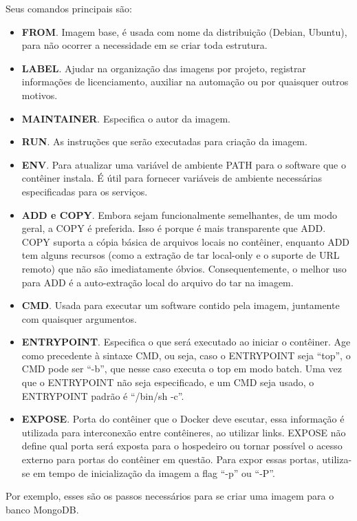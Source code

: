 \documentclass[a4paper,11pt]{article}
\begin{document}
Seus comandos principais são: \vspace{-1em}
\begin{itemize}
	\item \textbf{FROM}. Imagem base, é usada com nome da distribuição (Debian, Ubuntu), para não ocorrer a necessidade em se criar toda estrutura.
	\item \textbf{LABEL}. Ajudar na organização das imagens por projeto, registrar informações de licenciamento, auxiliar na automação ou por quaisquer outros motivos.
	\item \textbf{MAINTAINER}. Especifica o autor da imagem.
	\item \textbf{RUN}. As instruções que serão executadas para criação da imagem.
	\item \textbf{ENV}. Para atualizar uma variável de ambiente PATH para o software que o contêiner instala. É útil para fornecer variáveis de ambiente necessárias especificadas para os serviços.
	\item \textbf{ADD e COPY}. Embora sejam funcionalmente semelhantes, de um modo geral, a COPY é preferida. Isso é porque é mais transparente que ADD. COPY suporta a cópia básica de arquivos locais no contêiner, enquanto ADD tem alguns recursos (como a extração de tar local-only e o suporte de URL remoto) que não são imediatamente óbvios. Consequentemente, o melhor uso para ADD é a auto-extração local do arquivo do tar na imagem.
	\item \textbf{CMD}. Usada para executar um software contido pela imagem, juntamente com quaisquer argumentos.
	\item \textbf{ENTRYPOINT}. Especifica o que será executado ao iniciar o contêiner. Age como precedente à sintaxe CMD, ou seja, caso o ENTRYPOINT seja ``top'', o CMD pode ser ``-b'', que nesse caso executa o top em modo batch. Uma vez que o ENTRYPOINT não seja especificado, e um CMD seja usado, o ENTRYPOINT padrão é ``/bin/sh -c''. 
	\item \textbf{EXPOSE}. Porta do contêiner que o Docker deve escutar, essa informação é utilizada para interconexão entre contêineres, ao utilizar links. EXPOSE não define qual porta será exposta para o hospedeiro ou tornar possível o acesso externo para portas do contêiner em questão. Para expor essas portas, utiliza-se em tempo de inicialização da imagem a flag ``-p'' ou ``-P''.
\end{itemize}

Por exemplo, esses são os passos necessários para se criar uma imagem para o banco MongoDB.
\end{document}
